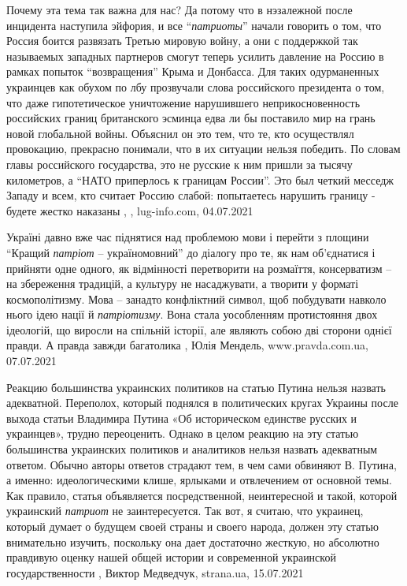 Почему эта тема так важна для нас? Да потому что в нэзалежной после инцидента
наступила эйфория, и все \enquote{\emph{патриоты}} начали говорить о том, что Россия боится
развязать Третью мировую войну, а они с поддержкой так называемых западных
партнеров смогут теперь усилить давление на Россию в рамках попыток
\enquote{возвращения} Крыма и Донбасса. Для таких одурманенных украинцев как обухом по
лбу прозвучали слова российского президента о том, что даже гипотетическое
уничтожение нарушившего неприкосновенность российских границ британского
эсминца едва ли бы поставило мир на грань новой глобальной войны. Объяснил он
это тем, что те, кто осуществлял провокацию, прекрасно понимали, что в их
ситуации нельзя победить. По словам главы российского государства, это не
русские к ним пришли за тысячу километров, а \enquote{НАТО приперлось к границам
России}. Это был четкий месседж Западу и всем, кто считает Россию слабой:
попытаетесь нарушить границу - будете жестко наказаны
, , lug-info.com, 04.07.2021

Україні давно вже час піднятися над проблемою мови і перейти з площини \enquote{Кращий
\emph{патріот} – україномовний} до діалогу про те, як нам об’єднатися і прийняти одне
одного, як відмінності перетворити на розмаїття, консерватизм – на збереження
традицій, а культуру не насаджувати, а творити у форматі космополітизму.
Мова – занадто конфліктний символ, щоб побудувати навколо нього ідею нації й
\emph{патріотизму}. Вона стала уособленням протистояння двох ідеологій, що виросли на
спільній історії, але являють собою дві сторони однієї правди. А правда завжди
багатолика
, 
Юлія Мендель, www.pravda.com.ua, 07.07.2021


Реакцию большинства украинских политиков на статью Путина нельзя назвать адекватной.
Переполох, который поднялся в политических кругах Украины после выхода статьи
Владимира Путина «Об историческом единстве русских и украинцев», трудно
переоценить. Однако в целом реакцию на эту статью большинства украинских
политиков и аналитиков нельзя назвать адекватным ответом.
Обычно авторы ответов страдают тем, в чем сами обвиняют В. Путина, а именно:
идеологическими клише, ярлыками и отвлечением от основной темы. Как правило,
статья объявляется посредственной, неинтересной и такой, которой украинский
\emph{патриот} не заинтересуется. Так вот, я считаю, что украинец, который думает о
будущем своей страны и своего народа, должен эту статью внимательно изучить,
поскольку она дает достаточно жесткую, но абсолютно правдивую оценку нашей
общей истории и современной украинской государственности
, 
Виктор Медведчук, strana.ua, 15.07.2021

